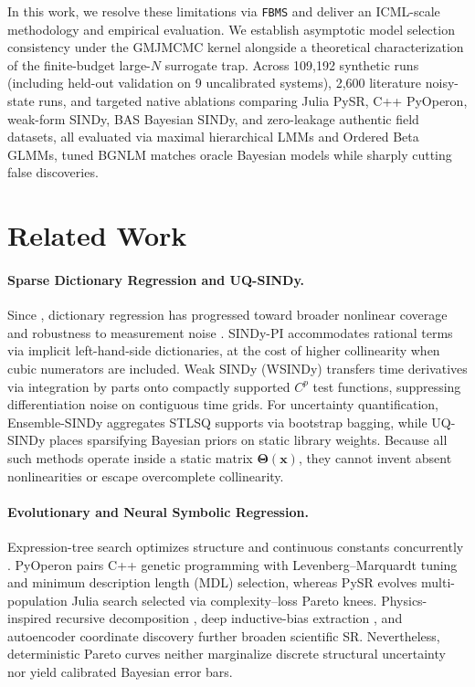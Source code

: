 \documentclass{article}
\begin{document}
In this work, we resolve these limitations via \texttt{FBMS} \citep{lachmann2025fbms} and deliver an ICML-scale methodology and empirical evaluation. We establish asymptotic model selection consistency under the GMJMCMC kernel alongside a theoretical characterization of the finite-budget large-$N$ surrogate trap. Across 109,192 synthetic runs (including held-out validation on 9 uncalibrated systems), 2,600 literature noisy-state runs, and targeted native ablations comparing Julia PySR, C++ PyOperon, weak-form SINDy, BAS Bayesian SINDy, and zero-leakage authentic field datasets, all evaluated via maximal hierarchical LMMs and Ordered Beta GLMMs, tuned BGNLM matches oracle Bayesian models while sharply cutting false discoveries.

\section{Related Work}

\paragraph{Sparse Dictionary Regression and UQ-SINDy.}
Since \citet{brunton2016discovering}, dictionary regression has progressed toward broader nonlinear coverage and robustness to measurement noise \citep{rudy2017data}. SINDy-PI \citep{kaheman2020sindy} accommodates rational terms via implicit left-hand-side dictionaries, at the cost of higher collinearity when cubic numerators are included. Weak SINDy (WSINDy) \citep{messenger2021weak} transfers time derivatives via integration by parts onto compactly supported $C^p$ test functions, suppressing differentiation noise on contiguous time grids. For uncertainty quantification, Ensemble-SINDy \citep{fasel2022ensemble} aggregates STLSQ supports via bootstrap bagging, while UQ-SINDy \citep{hirsh2022sparsifying} places sparsifying Bayesian priors on static library weights. Because all such methods operate inside a static matrix $\boldsymbol{\Theta}(\boldsymbol{x})$, they cannot invent absent nonlinearities or escape overcomplete collinearity.

\paragraph{Evolutionary and Neural Symbolic Regression.}
Expression-tree search optimizes structure and continuous constants concurrently \citep{schmidt2009distilling,lacava2021contemporary}. PyOperon \citep{burlacu2020operon} pairs C++ genetic programming with Levenberg--Marquardt tuning and minimum description length (MDL) selection, whereas PySR \citep{cranmer2023interpretable} evolves multi-population Julia search selected via complexity--loss Pareto knees. Physics-inspired recursive decomposition \citep{udrescu2020ai}, deep inductive-bias extraction \citep{cranmer2020discovering}, and autoencoder coordinate discovery \citep{champion2019data} further broaden scientific SR. Nevertheless, deterministic Pareto curves neither marginalize discrete structural uncertainty nor yield calibrated Bayesian error bars.
\end{document}
